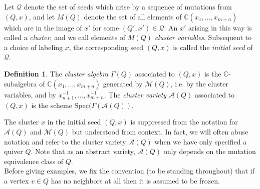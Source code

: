 \documentclass[11pt]{amsart}
\theoremstyle{definition}
\newtheorem{defn}[thm]{Definition}
\theoremstyle{remark}
\newcommand{\A}{\mathcal{A}}
\numberwithin{equation}{section}
\begin{document}
Let $\mathcal{Q}$ denote the set of seeds which arise by a sequence of mutations from $(Q, x)$, and let $M(Q)$ denote the set of all elements of $\mathbb{C}(x_1, ..., x_{m+n})$ which are in the image of $x'$ for some $(Q', x') \in \mathcal{Q}$. An $x'$ arising in this way is called a \textit{cluster}, and we call elements of $M(Q)$ \textit{cluster variables}. Subsequent to a choice of labeling $x$, the corresponding seed $(Q, x)$ is called the \textit{initial seed} of $\mathcal{Q}$.

\begin{defn}
    The \textit{cluster algebra} $\Gamma(Q)$ associated to $(Q, x)$ is the $\mathbb{C}$-subalgebra of $\mathbb{C}(x_1, ..., x_{m+n})$ generated by $\mathcal{M}(Q)$, i.e. by the cluster variables, and by $x_{n+1}^{-1}, ..., x_{m+n}^{-1}$. The \textit{cluster variety} $\mathcal{A}(Q)$ associated to $(Q, x)$ is the scheme Spec$(\Gamma(\A(Q))$.
\end{defn}

The cluster $x$ in the initial seed $(Q, x)$ is suppressed from the notation for $\mathcal{A}(Q)$ and $\mathcal{M}(Q)$ but understood from context. In fact, we will often abuse notation and refer to the cluster variety $\mathcal{A}(Q)$ when we have only specified a quiver $Q$. Note that as an abstract variety, $\mathcal{A}(Q)$ only depends on the mutation equivalence class of $Q$.\\

Before giving examples, we fix the convention (to be standing throughout) that if a vertex $v \in Q$ has no neighbors at all then it is assumed to be frozen.
\end{document}
